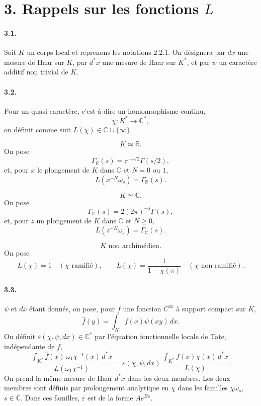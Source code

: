 \documentclass[10pt,letterpaper]{article}
\newcommand{\C}{\mathbb C}
\providecommand{\R}{\mathbb R}
\begin{document}
\section*{3. Rappels sur les fonctions \(L\)}

\paragraph{3.1.} Soit \(K\) un corps local et reprenons les notations 2.2.1. On désignera par \(dx\) une mesure de Haar sur \(K\), par \(d^*x\) une mesure de Haar sur \(K^*\), et par \(\psi\) un caractère additif non trivial de \(K\).

\paragraph{3.2.} Pour un quasi-caractère, c'est-à-dire un homomorphisme continu,
\[
\chi:K^*\longrightarrow\C^*,
\]
on définit comme suit \(L(\chi)\in\C\cup\{\infty\}\).

\[
\tag{3.2.1}
K\simeq\R.
\]
On pose
\[
\Gamma_\R(s)=\pi^{-s/2}\Gamma(s/2),
\]
et, pour \(x\) le plongement de \(K\) dans \(\C\) et \(N=0\) ou \(1\),
\[
L(x^{-N}\omega_s)=\Gamma_\R(s).
\]

\[
\tag{3.2.2}
K\simeq\C.
\]
On pose
\[
\Gamma_\C(s)=2(2\pi)^{-s}\Gamma(s),
\]
et, pour \(z\) un plongement de \(K\) dans \(\C\) et \(N\ge0\),
\[
L(z^{-N}\omega_s)=\Gamma_\C(s).
\]

\[
\tag{3.2.3}
K\text{ non archimédien.}
\]
On pose
\[
L(\chi)=1\quad(\chi\text{ ramifié}),
\qquad
L(\chi)=\frac1{1-\chi(\pi)}\quad(\chi\text{ non ramifié}).
\]

\paragraph{3.3.} \(\psi\) et \(dx\) étant donnés, on pose, pour \(f\) une fonction \(C^\infty\) à support compact sur \(K\),
\[
\widehat f(y)=\int_K f(x)\psi(xy)\,dx.
\]
On définit \(\varepsilon(\chi,\psi,dx)\in\C^*\) par l'équation fonctionnelle locale de Tate, indépendante de \(f\),
\[
\tag{3.3.1}
\frac{\displaystyle\int_{K^*}\widehat f(x)\,\omega_1\chi^{-1}(x)\,d^*x}
     {L(\omega_1\chi^{-1})}
=
\varepsilon(\chi,\psi,dx)\,
\frac{\displaystyle\int_{K^*}f(x)\chi(x)\,d^*x}
     {L(\chi)}.
\]
On prend la même mesure de Haar \(d^*x\) dans les deux membres. Les deux membres sont définis par prolongement analytique en \(\chi\) dans les familles \(\chi\omega_s\), \(s\in\C\). Dans ces familles, \(\varepsilon\) est de la forme \(Ae^{Bs}\).
\end{document}
